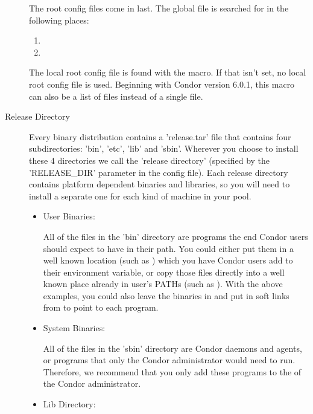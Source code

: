 \begin{description}
The root config files come in last.  The global file is searched for
in the following places:
\begin{enumerate}
   \item {}
   \item {}
\end{enumerate}

The local root config file is found with the
 macro.  If that isn't set, no local
root config file is used.  Beginning with Condor version 6.0.1, this
macro can also be a list of files instead of a single file.

\item[Release Directory]

Every binary distribution contains a 'release.tar' file that contains
four subdirectories: 'bin', 'etc', 'lib' and 'sbin'.  Wherever you
choose to install these 4 directories we call the 'release directory'
(specified by the 'RELEASE\_DIR' parameter in the config file).  Each
release directory contains platform dependent binaries and libraries,
so you will need to install a separate one for each kind of machine in
your pool.

\begin{itemize}
     \item User Binaries:

     All of the files in the 'bin' directory are programs the end
     Condor users should expect to have in their path.  You could
     either put them in a well known location (such as
     ) which you have Condor users add to
     their  environment variable, or copy those files
     directly into a well known place already in user's PATHs (such as
     ).  With the above examples, you could also
     leave the binaries in  and put in
     soft links from  to point to each program.

     \item System Binaries:

     All of the files in the 'sbin' directory are Condor daemons and
     agents, or programs that only the Condor administrator would need
     to run.  Therefore, we recommend that you only add these programs
     to the  of the Condor administrator.

     \item Lib Directory:


\end{itemize}
\end{description}
